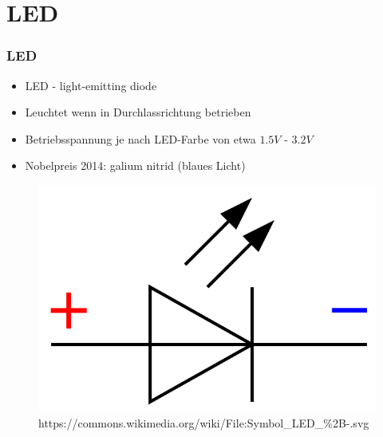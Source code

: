 \section*{LED}

\begin{frame}
    \frametitle{LED}
      	\begin{itemize}
			\item LED - light-emitting diode
			\item Leuchtet wenn in Durchlassrichtung betrieben
			\item Betriebsspannung je nach LED-Farbe von etwa $1.5V$ - $3.2V$
            \item Nobelpreis 2014: galium nitrid (blaues Licht)
    \end{itemize}    
    \begin{center}
	\begin{figure}
        \includegraphics[width=1.0\textwidth,height=.5\textheight, keepaspectratio]{e12/Symbol_LED.png}
	 {https://commons.wikimedia.org/wiki/File:Symbol_LED_\%2B-.svg}{\ccpd}
	\end{figure}
	\end{center}
\end{frame}

